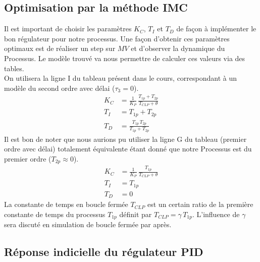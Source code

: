 \subsection{Optimisation par la méthode IMC}
Il est important de choisir les paramètres $K_C$, $T_I$ et $T_D$ de façon à implémenter le bon régulateur pour notre processus.
Une façon d'obtenir ces paramètres optimaux est de réaliser un step sur $MV$ et d'observer la dynamique du Processus.
Le modèle trouvé va nous permettre de calculer ces valeurs via des tables.\\
On utilisera la ligne I du tableau présent dans le cours, correspondant à un modèle du second ordre avec délai ($\tau_3 = 0$).
\begin{align*}
    K_C &= \frac{1}{K_P} \, \frac{T_{1p} + T_{2p}}{T_{CLP} + \theta}\\[4pt]
    T_I &= T_{1p} + T_{2p}\\[4pt]
    T_D &= \frac{T_{1p} \, T_{2p}}{T_{1p} + T_{2p}}
\end{align*}
Il est bon de noter que nous aurions pu utiliser la ligne G du tableau (premier ordre avec délai) totalement équivalente étant donné que notre Processus est du premier ordre ($T_{2p} \approx 0$).
\begin{align*}
    K_C &= \frac{1}{K_P} \, \frac{T_{1p}}{T_{CLP} + \theta}\\[4pt]
    T_I &= T_{1p}\\[4pt]
    T_D &= 0
\end{align*}
La constante de temps en boucle fermée $T_{CLP}$ est un certain ratio de la première constante de temps du processus $T_{1p}$ définit par $T_{CLP} = \gamma \, T_{1p}$. L'influence de $\gamma$ sera discuté en simulation de boucle fermée par après.

\subsection{Réponse indicielle du régulateur PID}

